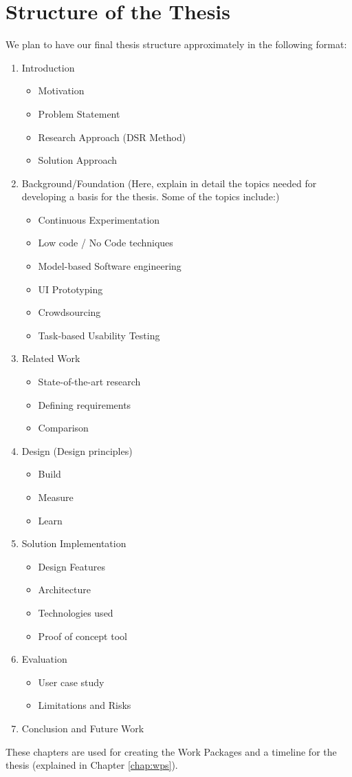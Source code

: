 \chapter{Structure of the Thesis} \label{sec:structure}

We plan to have our final thesis structure approximately in the following format: 

\begin{enumerate}
	\item Introduction
	\begin{itemize}
		\item Motivation
		\item Problem Statement
		\item Research Approach (DSR Method)
		\item Solution Approach
	\end{itemize}
	\item Background/Foundation (Here, explain in detail the topics needed for developing a basis for the thesis. Some of the topics include:)
	\begin{itemize}
		\item Continuous Experimentation
		\item Low code / No Code techniques
		\item Model-based Software engineering
		\item UI Prototyping
		\item Crowdsourcing
		\item Task-based Usability Testing
	\end{itemize}
	\item Related Work
	\begin{itemize}
		\item State-of-the-art research
		\item Defining requirements
		\item Comparison
	\end{itemize}
	\item Design (Design principles)
	\begin{itemize}
		\item Build
		\item Measure
		\item Learn
	\end{itemize}
	\item Solution Implementation
	\begin{itemize}
		\item Design Features
		\item Architecture
		\item Technologies used
		\item Proof of concept tool
	\end{itemize}
	\item Evaluation
	\begin{itemize}
		\item User case study
		\item Limitations and Risks
	\end{itemize}
	\item Conclusion and Future Work
\end{enumerate}

These chapters are used for creating the Work Packages and a timeline for the thesis (explained in Chapter \ref{chap:wps}).